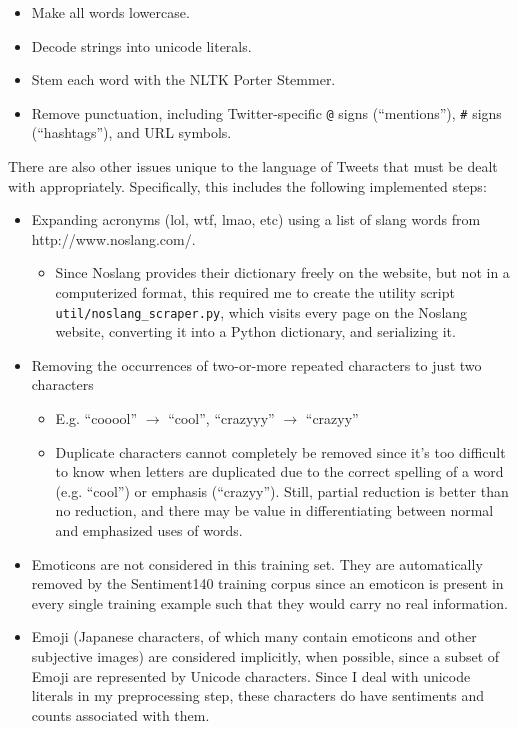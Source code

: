 \documentclass[letter,12pt]{article}
\begin{document}
\begin{itemize}
  \item Make all words lowercase.
  \item Decode strings into unicode literals.
  \item Stem each word with the NLTK Porter Stemmer.
  \item Remove punctuation, including Twitter-specific \texttt{@} signs
    (``mentions''), \texttt{\#} signs (``hashtags''), and URL symbols.
\end{itemize}

There are also other issues unique to the language of Tweets that must
be dealt with appropriately. Specifically, this includes the following
implemented steps:

\begin{itemize}
  \item Expanding acronyms (lol, wtf, lmao, etc) using a list of slang words
    from http://www.noslang.com/.
    \begin{itemize}
      \item Since Noslang provides their dictionary freely on the website, but
        not in a computerized format, this required me to create the utility script
        \texttt{util/noslang\_scraper.py}, which visits every page on the
        Noslang website, converting it into a Python dictionary, and
        serializing it.
    \end{itemize}
  \item Removing the occurrences of two-or-more repeated characters to just
    two characters
    \begin{itemize}
      \item E.g. ``cooool'' $\rightarrow$ ``cool'', ``crazyyy'' $\rightarrow$
        ``crazyy''
      \item Duplicate characters cannot completely be removed since it's too
        difficult to know when letters are duplicated due to the correct
        spelling of a word (e.g. ``cool'') or emphasis (``crazyy''). Still,
        partial reduction is better than no reduction, and there may be value
        in differentiating between normal and emphasized uses of words.
    \end{itemize}
    \item Emoticons are not considered in this training set. They are
      automatically removed by the Sentiment140 training corpus since an
      emoticon is present in every single training example such that they would
      carry no real information.
    \item Emoji (Japanese characters, of which many contain emoticons and other
      subjective images) are considered implicitly, when possible, since a
      subset of Emoji are represented by Unicode characters. Since I deal with
      unicode literals in my preprocessing step, these characters do have
      sentiments and counts associated with them.
\end{itemize}
\end{document}
